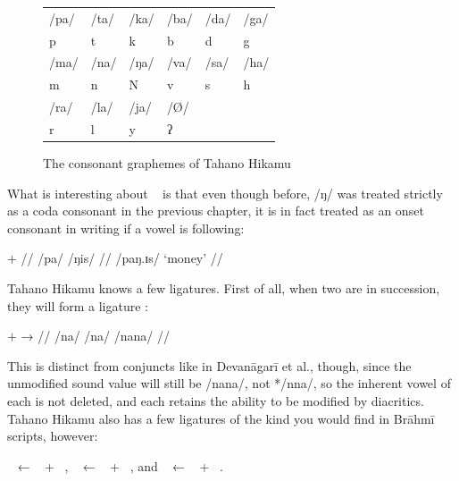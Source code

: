 \begin{figure}[ht]
\caption{The consonant graphemes of Tahano Hikamu}

\begin{tabu} to \linewidth{X[c] X[c] X[c] X[c] X[c] X[c]}
\toprule
\tableheaderfont	/pa/ & /ta/ & /ka/ & /ba/ & /da/ & /ga/ \\
\rowfont{\Tagati\huge}	p & t & k & b & d & g \\

\midrule

\tableheaderfont	/ma/ & /na/ & /ŋa/ & /va/ & /sa/ & /ha/ \\
\rowfont{\Tagati\huge}	m & n & N & v & s & h \\

\midrule

\tableheaderfont	/ra/ & /la/ & /ja/ & /Ø/ \\
\rowfont{\Tagati\huge}	r & l & y & ʔ \\

\bottomrule
\end{tabu}
\label{fig:thcons}
\end{figure}

What is interesting about ~ is that even though before, /ŋ/ 
was treated strictly as a coda consonant in the previous chapter, it is in fact 
treated as an onset consonant in writing if a vowel is following:

\ex[lingstyle=thex]\begingl
	\gla {}	$+$	 //
	\glb /pa/	{}	/ŋis/ //
	\glft {} /paŋ.ɪs/ `money' //
\endgl\xe

Tahano Hikamu knows a few ligatures. First of all, when two   
are in succession, they will form a ligature  :

\ex[lingstyle=thex]\begingl
	\gla {}	$+$		→	 //
	\glb /na/	{}	/na/	{}	/nana/ //
\endgl\xe

\noindent This is distinct from conjuncts like in Devanāgarī et al., though, 
since the unmodified sound value will still be /nana/, not */nna/, so the 
inherent vowel of each   is not deleted, and each  
 retains the ability to be modified by diacritics. Tahano Hikamu also 
has a few ligatures of the kind you would find in Brāhmī scripts, however:

\pex
	\a {}~ ← ~ + ~,
	\a {}~ ← ~ + ~, and 
	\a {}~ ← ~ + ~.
\xe

